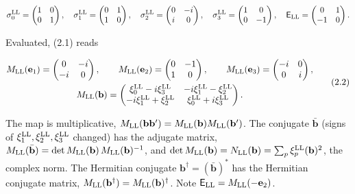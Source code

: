 \documentclass[
  10pt,
]{article}
\begin{document}
\[\sigma^{\rm LL}_0=\begin{pmatrix}1&0\\0&1\end{pmatrix},\quad \sigma^{\rm LL}_1=\begin{pmatrix}0&1\\1&0\end{pmatrix},\quad \sigma^{\rm LL}_2=\begin{pmatrix}0&-i\\i&0\end{pmatrix},\quad \sigma^{\rm LL}_3=\begin{pmatrix}1&0\\0&-1\end{pmatrix},\quad \mathsf E_{\rm LL}=\begin{pmatrix}0&1\\-1&0\end{pmatrix}.\]

Evaluated, (2.1) reads

\[\begin{gathered}M_{\rm LL}(\mathbf e_1)=\begin{pmatrix}0&-i\\-i&0\end{pmatrix},\qquad M_{\rm LL}(\mathbf e_2)=\begin{pmatrix}0&-1\\1&0\end{pmatrix},\qquad M_{\rm LL}(\mathbf e_3)=\begin{pmatrix}-i&0\\0&i\end{pmatrix},\\ M_{\rm LL}(\mathbf b)=\begin{pmatrix}\xi^{\rm LL}_0-i\xi^{\rm LL}_3&-i\xi^{\rm LL}_1-\xi^{\rm LL}_2\\-i\xi^{\rm LL}_1+\xi^{\rm LL}_2&\xi^{\rm LL}_0+i\xi^{\rm LL}_3\end{pmatrix}.\end{gathered}\tag{2.2}\]

The map is multiplicative,
\(M_{\rm LL}(\mathbf b\mathbf b')=M_{\rm LL}(\mathbf b)M_{\rm LL}(\mathbf b')\).
The conjugate \(\bar{\mathbf b}\) (signs of
\(\xi^{\rm LL}_1,\xi^{\rm LL}_2,\xi^{\rm LL}_3\) changed) has the
adjugate matrix,
\(M_{\rm LL}(\bar{\mathbf b})=\det M_{\rm LL}(\mathbf b)\,M_{\rm LL}(\mathbf b)^{-1}\),
and
\(\det M_{\rm LL}(\mathbf b)=N_{\rm LL}(\mathbf b)=\sum_p\xi^{\rm LL}_p(\mathbf b)^2\),
the complex norm. The Hermitian conjugate
\(\mathbf b^\dagger=(\bar{\mathbf b})^*\) has the Hermitian conjugate
matrix, \(M_{\rm LL}(\mathbf b^\dagger)=M_{\rm LL}(\mathbf b)^\dagger\).
Note \(\mathsf E_{\rm LL}=M_{\rm LL}(-\mathbf e_2)\).
\end{document}
